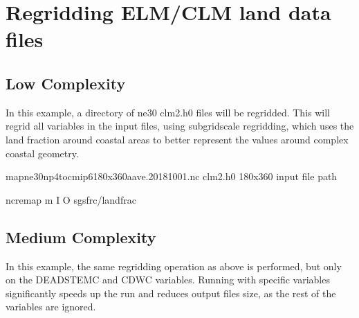 \documentclass[letterpaper,10pt,english]{sphinxmanual}
\begin{document}
\section{Regridding ELM/CLM land data files}
\label{\detokenize{lnd_regrid:regridding-elm-clm-land-data-files}}

\subsection{Low Complexity}
\label{\detokenize{lnd_regrid:low-complexity}}
In this example, a directory of ne30 clm2.h0 files will be regridded. This will regrid all variables in the input files, using sub\sphinxhyphen{}grid\sphinxhyphen{}scale
regridding, which uses the land fraction around coastal areas to better represent the values around complex coastal geometry.

\begin{sphinxVerbatim}[commandchars=\\\{\}]
map\PYGZus{}ne30np4\PYGZus{}to\PYGZus{}cmip6\PYGZus{}180x360\PYGZus{}aave.20181001.nc   
clm2.h0                                       
180x360                                      
\PYGZlt{}input file path\PYGZgt{}                             

ncremap \PYGZhy{}m  \PYGZhy{}I  \PYGZhy{}O  \PYGZhy{}\PYGZhy{}sgs\PYGZus{}frc/landfrac
\end{sphinxVerbatim}


\subsection{Medium Complexity}
\label{\detokenize{lnd_regrid:medium-complexity}}
In this example, the same regridding operation as above is performed, but only on the DEADSTEMC and CDWC variables.
Running with specific variables significantly speeds up the run and reduces output files size, as the rest of the variables are ignored.
\end{document}
